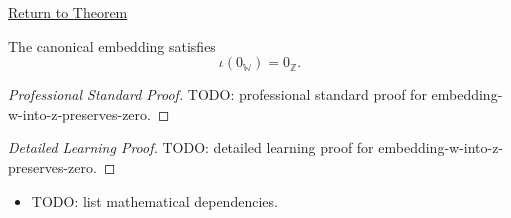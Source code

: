 \newpage
{}
\label{prf:embedding-w-into-z-preserves-zero}

\begin{remark*}[Return]
\hyperref[thm:embedding-w-into-z-preserves-zero]{Return to Theorem}
\end{remark*}

\begin{theorem*}
The canonical embedding satisfies
\[
\iota(0_{\mathbb{W}})=0_{\mathbb{Z}}.
\]
\end{theorem*}

\begin{proof}[Professional Standard Proof]
\LRAProofBodyStart
TODO: professional standard proof for embedding-w-into-z-preserves-zero.
\end{proof}

\begin{proof}[Detailed Learning Proof]
\LRAProofBodyStart
TODO: detailed learning proof for embedding-w-into-z-preserves-zero.
\end{proof}

\begin{remark*}
\end{remark*}

\begin{dependencies}
\begin{itemize}
  \item TODO: list mathematical dependencies.
\end{itemize}
\end{dependencies}

\clearpage
